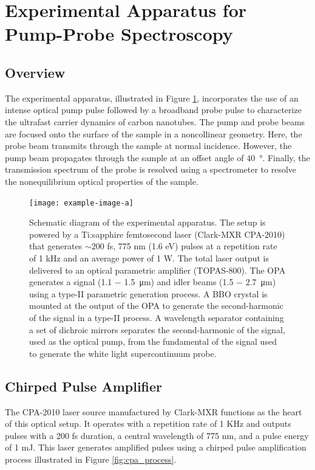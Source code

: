 \section{Experimental Apparatus for Pump-Probe Spectroscopy}

\subsection{Overview}
The experimental apparatus, illustrated in Figure \ref{fig:setup_schematic}, incorporates the use of an intense optical pump pulse followed by a broadband probe pulse to characterize the ultrafast carrier dynamics of carbon nanotubes. The pump and probe beams are focused onto the surface of the sample in a noncollinear geometry. Here, the probe beam transmits through the sample at normal incidence. However, the pump beam propagates through the sample at an offset angle of \SI{40}{\degree}. Finally, the transmission spectrum of the probe is resolved using a spectrometer to resolve the nonequilibrium optical properties of the sample.


\begin{figure}[ht]
	\centering
	\texttt{[image: example-image-a]}
	\caption{Schematic diagram of the experimental apparatus. The setup is powered by a Ti:sapphire femtosecond laser (Clark-MXR CPA-2010) that generates $\sim$200 fs, 775 nm (1.6 eV) pulses at a repetition rate of 1 kHz and an average power of 1 W. The total laser output is delivered to an optical parametric amplifier (TOPAS-800). The OPA generates a signal (1.1 $-$ \SI{1.5}{\micro\meter}) and idler beams (1.5 $-$ \SI{2.7}{\micro\meter}) using a type-II parametric generation process.  A BBO crystal is mounted at the output of the OPA to generate the second-harmonic of the signal in a type-II process. A wavelength separator containing a set of dichroic mirrors separates the second-harmonic of the signal, used as the optical pump, from the fundamental of the signal used to generate the white light supercontinuum probe.}
	\label{fig:setup_schematic}
\end{figure}


\subsection{Chirped Pulse Amplifier}
The CPA-2010 laser source manufactured by Clark-MXR functions as the heart of this optical setup. It operates with a repetition rate of 1 KHz and outputs pulses with a 200 fs duration, a central wavelength of 775 nm, and a pulse energy of 1 mJ. This laser generates amplified pulses using a chirped pulse amplification process illustrated in Figure \ref{fig:cpa_process}.

